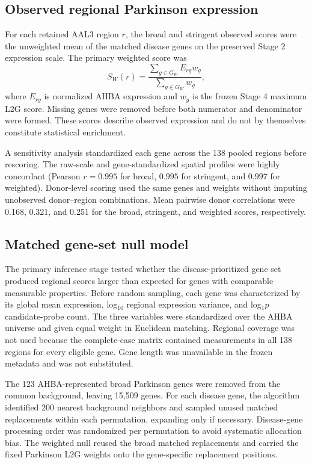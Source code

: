 \documentclass[10pt,twocolumn]{article}
\begin{document}
\subsection{Observed regional Parkinson expression}

For each retained AAL3 region $r$, the broad and stringent observed scores were the unweighted mean of the matched disease genes on the preserved Stage 2 expression scale. The primary weighted score was
\begin{equation}
S_W(r)=
\frac{\sum_{g\in G_W} E_{rg}w_g}
{\sum_{g\in G_W} w_g},
\end{equation}
where $E_{rg}$ is normalized AHBA expression and $w_g$ is the frozen Stage 4 maximum L2G score. Missing genes were removed before both numerator and denominator were formed. These scores describe observed expression and do not by themselves constitute statistical enrichment.

A sensitivity analysis standardized each gene across the 138 pooled regions before rescoring. The raw-scale and gene-standardized spatial profiles were highly concordant (Pearson $r=0.995$ for broad, $0.995$ for stringent, and $0.997$ for weighted). Donor-level scoring used the same genes and weights without imputing unobserved donor--region combinations. Mean pairwise donor correlations were 0.168, 0.321, and 0.251 for the broad, stringent, and weighted scores, respectively.

\subsection{Matched gene-set null model}

The primary inference stage tested whether the disease-prioritized gene set produced regional scores larger than expected for genes with comparable measurable properties. Before random sampling, each gene was characterized by its global mean expression, log$_{10}$ regional expression variance, and log$_1p$ candidate-probe count. The three variables were standardized over the AHBA universe and given equal weight in Euclidean matching. Regional coverage was not used because the complete-case matrix contained measurements in all 138 regions for every eligible gene. Gene length was unavailable in the frozen metadata and was not substituted.

The 123 AHBA-represented broad Parkinson genes were removed from the common background, leaving 15,509 genes. For each disease gene, the algorithm identified 200 nearest background neighbors and sampled unused matched replacements within each permutation, expanding only if necessary. Disease-gene processing order was randomized per permutation to avoid systematic allocation bias. The weighted null reused the broad matched replacements and carried the fixed Parkinson L2G weights onto the gene-specific replacement positions.
\end{document}
